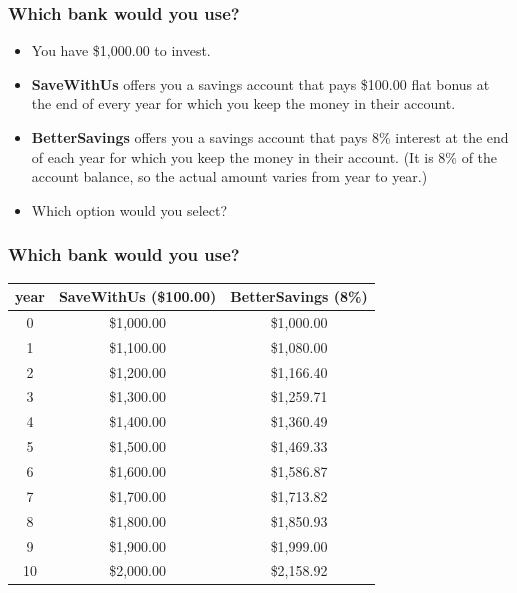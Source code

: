\documentclass[notheorems
          ]
          {beamer}
\begin{document}
\begin{frame}
 \frametitle { Which bank would you use? }
 
 
 \begin{itemize}
  \item  You have \$1,000.00 to invest.  
  \item \textbf{SaveWithUs} offers you a savings account that pays \$100.00 flat bonus at the end of every year
    for which you keep the money in their account. 
  \item  \textbf{BetterSavings} offers you a savings account that pays 8\% interest at the end of each year 
    for which you keep the money in their account. (It is 8\% of the account balance, so the actual amount varies from year to year.) 
  \item Which option would you select? 
        
 \end{itemize}

\end{frame}



\begin{frame}
 \frametitle { Which bank would you use? }
 
  {%
\begin{center}
\begin{tabular}{c|c|c|}
\textbf{year} & \textbf{SaveWithUs (\$100.00)} &\textbf{BetterSavings (8\%)}\\ \hline  \hline 
0 & \$1,000.00 & \$1,000.00\\
1 & \$1,100.00 & \$1,080.00 \\
2 & \$1,200.00 & \$1,166.40 \\
3 & \$1,300.00 & \$1,259.71 \\
4 & \$1,400.00 & \$1,360.49 \\
5 & \$1,500.00 & \$1,469.33 \\
6 & \$1,600.00 & \$1,586.87 \\
7 & \$1,700.00 & \$1,713.82 \\
8 & \$1,800.00 & \$1,850.93 \\
9 & \$1,900.00 & \$1,999.00 \\
10 & \$2,000.00 & \$2,158.92 \\
  \end{tabular}
  \end{center}
}%


\end{frame}
\end{document}

